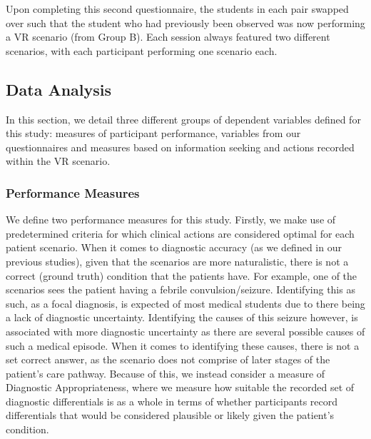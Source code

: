 \documentclass[a4paper, nobind]{templates/ociamthesis}
\begin{document}
Upon completing this second questionnaire, the students in each pair swapped over such that the student who had previously been observed was now performing a VR scenario (from Group B). Each session always featured two different scenarios, with each participant performing one scenario each.

\subsection{Data Analysis}\label{data-analysis-2}

In this section, we detail three different groups of dependent variables defined for this study: measures of participant performance, variables from our questionnaires and measures based on information seeking and actions recorded within the VR scenario.

\subsubsection{Performance Measures}\label{performance-measures}

We define two performance measures for this study. Firstly, we make use of predetermined criteria for which clinical actions are considered optimal for each patient scenario. When it comes to diagnostic accuracy (as we defined in our previous studies), given that the scenarios are more naturalistic, there is not a correct (ground truth) condition that the patients have. For example, one of the scenarios sees the patient having a febrile convulsion/seizure. Identifying this as such, as a focal diagnosis, is expected of most medical students due to there being a lack of diagnostic uncertainty. Identifying the causes of this seizure however, is associated with more diagnostic uncertainty as there are several possible causes of such a medical episode. When it comes to identifying these causes, there is not a set correct answer, as the scenario does not comprise of later stages of the patient's care pathway. Because of this, we instead consider a measure of Diagnostic Appropriateness, where we measure how suitable the recorded set of diagnostic differentials is as a whole in terms of whether participants record differentials that would be considered plausible or likely given the patient's condition.
\end{document}
